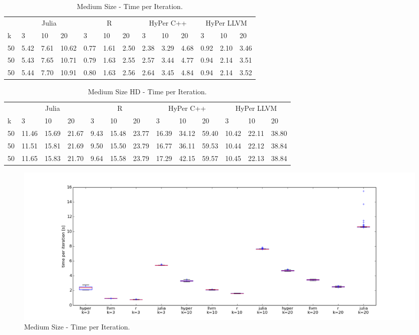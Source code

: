 \begin{table}[htsb]
  \caption[Medium Size - Time per Iteration]{Medium Size - Time per Iteration.}
  \label{tab:medium_all}
  \centering
  \begin{tabular}{l l l l l l l l l l l l l}
    \toprule
      & \multicolumn{3}{c}{Julia} & \multicolumn{3}{c}{R} & \multicolumn{3}{c}{HyPer C++} & \multicolumn{3}{c}{HyPer LLVM}  \\
      k & 3 & 10 & 20 & 3 & 10 & 20 & 3 & 10 & 20 & 3 & 10 & 20 \\
    \midrule
      50  & 5.42 & 7.61 & 10.62 & 0.77 & 1.61 & 2.50 & 2.38 & 3.29 & 4.68 & 0.92 & 2.10 & 3.46 \\
      50  & 5.43 & 7.65 & 10.71 & 0.79 & 1.63 & 2.55 & 2.57 & 3.44 & 4.77 & 0.94 & 2.14 & 3.51 \\
      50  & 5.44 & 7.70 & 10.91 & 0.80 & 1.63 & 2.56 & 2.64 & 3.45 & 4.84 & 0.94 & 2.14 & 3.52 \\
    \bottomrule
  \end{tabular}
\end{table}

\begin{table}[htsb]
  \caption[Medium Size HD - Time per Iteration]{Medium Size HD - Time per Iteration.}
  \label{tab:medium_hd_all}
  \centering
  \begin{tabular}{l l l l l l l l l l l l l}
    \toprule
      & \multicolumn{3}{c}{Julia} & \multicolumn{3}{c}{R} & \multicolumn{3}{c}{HyPer C++} & \multicolumn{3}{c}{HyPer LLVM}  \\
      k & 3 & 10 & 20 & 3 & 10 & 20 & 3 & 10 & 20 & 3 & 10 & 20 \\
    \midrule
      50  & 11.46 & 15.69 & 21.67 & 9.43 & 15.48 & 23.77 & 16.39 & 34.12 & 59.40 & 10.42 & 22.11 & 38.80 \\
      50  & 11.51 & 15.81 & 21.69 & 9.50 & 15.50 & 23.79 & 16.77 & 36.11 & 59.53 & 10.44 & 22.12 & 38.84 \\
      50  & 11.65 & 15.83 & 21.70 & 9.64 & 15.58 & 23.79 & 17.29 & 42.15 & 59.57 & 10.45 & 22.13 & 38.84 \\
    \bottomrule
  \end{tabular}
\end{table}


\begin{figure}[htsb]
  \raggedleft
  \includegraphics[scale=0.4, trim="0cm 1cm 0cm 0cm"]{figures/charts/15M_all}
  \caption[Medium Size - Time per Iteration]{Medium Size - Time per Iteration.}
  \label{fig:15M_all}
\end{figure}


